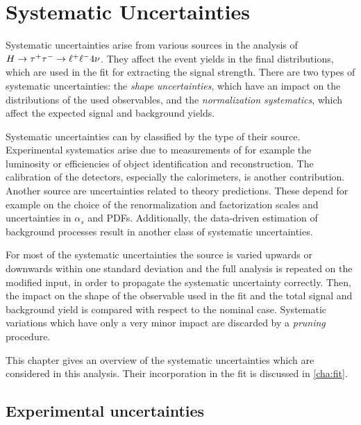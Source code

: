 \chapter{Systematic Uncertainties}\label{cha:systematics}

Systematic uncertainties arise from various sources in the analysis of $H \to \tau^+\tau^- \to \ell^+\ell^- 4\nu$.
They affect the event yields in the final distributions, which are used in the fit for extracting the signal strength.
There are two types of systematic uncertainties: the \emph{shape uncertainties}, which have an impact on
the distributions of the used observables, and the \emph{normalization systematics}, which affect the
expected signal and background yields.

Systematic uncertainties can by classified by the type of their source.
Experimental systematics arise due to measurements of for example the luminosity or
efficiencies of object identification and reconstruction.
The calibration of the detectors, especially the calorimeters, is another contribution.
Another source are uncertainties related to theory predictions.
These depend for example on the choice of the renormalization and factorization scales and uncertainties in $\alpha_s$
and PDFs.
Additionally, the data-driven estimation of background processes result in another class of systematic uncertainties.

For most of the systematic uncertainties the source is varied upwards or downwards within one standard deviation and the full
analysis is repeated on the modified input, in order to propagate the systematic uncertainty correctly.
Then, the impact on the shape of the observable used in the fit and the total signal and background yield is compared
with respect to the nominal case.
Systematic variations which have only a very minor impact are discarded by a \emph{pruning} procedure.

This chapter gives an overview of the systematic uncertainties which are considered in this analysis.
Their incorporation in the fit is discussed in \cref{cha:fit}.

\section{Experimental uncertainties}\label{sec:systematics:exp}


